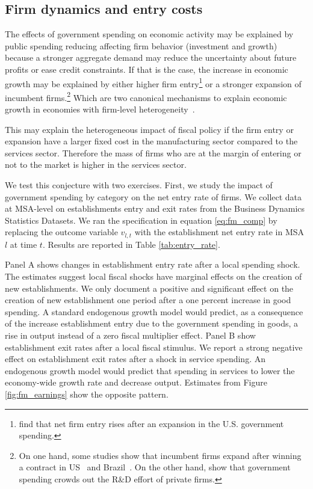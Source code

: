 \documentclass[dv_diss_main.tex]{subfiles}
\begin{document}
\subsection{Firm dynamics and entry costs}\label{subsec:bus_dyn}

The effects of government spending on economic activity may be explained by public spending reducing affecting firm behavior (investment and growth) because a stronger aggregate demand may reduce the uncertainty about future profits or ease credit constraints. If that is the case, the increase in economic growth may be explained by either higher firm entry\footnote{\cite{Lewis2017} find that net firm entry rises after an expansion in the U.S. government spending.} or a stronger expansion of incumbent firms.\footnote{On one hand, some studies show that incumbent firms expand after winning a contract in US~\citep{Juarros2021} and Brazil~\citep{Ferraz2015, Lee2021}. On the other hand, \cite{Atanassov2018} show that government spending crowds out the R\&D effort of private firms.} Which are two canonical mechanisms to explain economic growth in economies with firm-level heterogeneity~\citep{Acemoglu2018}.

This may explain the heterogeneous impact of fiscal policy if the firm entry or expansion have a larger fixed cost in the manufacturing sector compared to the services sector. Therefore the mass of firms who are at the margin of entering or not to the market is higher in the services sector. 

We test this conjecture with two exercises. First, we study the impact of government spending by category on the net entry rate of firms. We collect data at MSA-level on establishments entry and exit rates from the Business Dynamics Statistics Datasets. We ran the specification in equation \eqref{eq:fm_comp} by replacing the outcome variable $v_{l,t}$ with the establishment net entry rate in MSA $l$ at time $t$. Results are reported in Table \ref{tab:entry_rate}. 

Panel A shows changes in establishment entry rate after a local spending shock. The estimates suggest local fiscal shocks have marginal effects on the creation of new establishments. We only document a positive and significant effect on the creation of new establishment one period after a one percent increase in good spending. A standard endogenous growth model would predict, as a consequence of the increase establishment entry due to the government spending in goods, a rise in output instead of a zero fiscal multiplier effect. Panel B show establishment exit rates after a local fiscal stimulus. We report a strong negative effect on establishment exit rates after a shock in service spending. An endogenous growth model would predict that spending in services to lower the economy-wide growth rate and decrease output. Estimates from Figure \ref{fig:fm_earnings} show the opposite pattern. 
\end{document}
